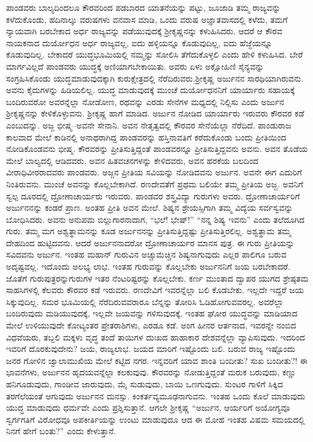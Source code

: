 ಪಾಂಡವರು ಬಾಲ್ಯದಿಂದಲೂ ಕೌರವರಿಂದ ಪಡಬಾರದ ಯಾತನೆಯನ್ನು ಪಟ್ಟು, ಜೂಜಾಡಿ ತಮ್ಮ ರಾಜ್ಯವನ್ನು ಕಳೆದುಕೊಂಡು, ಹದಿನಾಲ್ಕು ವರುಷಗಳು ವನವಾಸ ಮಾಡಿ, ಒಂದು ವರುಷ ಅಜ್ಞಾತವಾಸದಲ್ಲಿ ಕಳೆದು, ತಮಗೆ ನ್ಯಾಯವಾಗಿ ಬರಬೇಕಾದ ಅರ್ಧ ರಾಜ್ಯವನ್ನು ಪಡೆಯುವುದಕ್ಕೆ ಶ‍್ರೀಕೃಷ್ಣನನ್ನು ಕಳುಹಿಸಿದರು. ಆದರೆ ಆ ಕೌರವ ನಾಯಕನಾದ ದುರ್ಯೋಧನ ಅರ್ಧ ರಾಜ್ಯವಲ್ಲ, ಐದು ಹಳ್ಳಿಯನ್ನೂ ಕೊಡುವುದಿಲ್ಲ, ಐದು ಹೆಜ್ಜೆಯನ್ನೂ ಕೊಡುವುದಿಲ್ಲ. ಬೇಕಾದರೆ ಯುದ್ಧಭೂಮಿಯಲ್ಲಿ ನಮ್ಮನ್ನು ಸೋಲಿಸಿ ತೆಗೆದುಕೊಳ್ಳಲಿ ಎಂದು ಹೇಳಿ ಕಳುಹಿಸಿದ. ಬೇರೆ ಮಾರ್ಗವಿಲ್ಲದೆ ಪಾಂಡವರು ಯುದ್ಧಕ್ಕೆ ಅಣಿಯಾಗಬೇಕಾಯಿತು. ಅವರು ಏಳು ಅಕ್ಷೋಹಿಣಿ ಸೈನ್ಯವನ್ನು ಸಂಗ್ರಹಿಸಿಕೊಂಡು ಯುದ್ಧಮಾಡುವುದಕ್ಕಾಗಿ ಕುರುಕ್ಷೇತ್ರದಲ್ಲಿ ನೆರೆದಿರುವರು.\break ಶ‍್ರೀಕೃಷ್ಣ ಅರ್ಜುನನ ಸಾರಥಿಯಾಗಿರುವನು. ಅವನು ಕೈದುಗಳನ್ನು ಹಿಡಿಯಲಿಲ್ಲ. ಯುದ್ಧ ಮಾಡುವುದಕ್ಕೆ ಮುಂಚೆ ದುರ್ಯೋಧನನಿಗೆ ಯಾರ್ಯಾರು ಸಹಾಯಕ್ಕೆ ಬಂದಿರುವರೋ ಅವರ\-ನ್ನೆಲ್ಲಾ ನೋಡೋಣ, ರಥವನ್ನು ಎರಡು ಸೇನೆಗಳ ಮಧ್ಯದಲ್ಲಿ ನಿಲ್ಲಿಸು ಎಂದು ಅರ್ಜುನ ಶ‍್ರೀಕೃಷ್ಣನನ್ನು ಕೇಳಿಕೊಳ್ಳುವನು. ಶ‍್ರೀಕೃಷ್ಣ ಹಾಗೆ ಮಾಡಿದ. ಅರ್ಜುನ ನೋಡಿದ ಯಾರ್ಯಾರು ಇರುವರು ಕೌರವರ ಕಡೆ ಎಂಬುದನ್ನು. ಅಜ್ಜ ಭೀಷ್ಮ–ಅವನೇ ಸೇನಾನಿ. ಅವನ ನೇತೃತ್ವದಲ್ಲಿ ಕೌರವರ ಸೇನೆಯೆಲ್ಲಾ ನೆರೆದಿದೆ. ಪಾಂಡುರಾಜ ಕಾಲವಾದ ಮೇಲೆ ಕಾಡಿನಲ್ಲಿ ಅನಾಥರಾಗಿದ್ದ ಪಾಂಡವರನ್ನು ಹಸ್ತಿನಾವತಿಗೆ ಕರೆದುಕೊಂಡು ಬಂದು ಪ್ರೀತಿಯಿಂದ ನೋಡಿಕೊಂಡವನು ಭೀಷ್ಮ. ಕೌರವರನ್ನು ಪ್ರೀತಿಸುತ್ತಿದ್ದಂತೆ ಪಾಂಡವರನ್ನೂ ಪ್ರೀತಿಸುತ್ತಿದ್ದವನು ಅವನು. ಅವನ ತೊಡೆಯ ಮೇಲೆ ಬಾಲ್ಯದಲ್ಲಿ ಆಡಿದವರು, ಅವನ ಹಿತವಚನಗಳನ್ನು ಕೇಳಿದವರು, ಅವನ ಹರಕೆಯ ಬಲದಿಂದ ವೀರಾಧಿವೀರರಾದವರು ಪಾಂಡವರು. ಅಜ್ಜನ ಪ್ರೀತಿಯ ಸವಿಯನ್ನು ನೋಡಿದವನು ಅರ್ಜುನ. ಅವನೇ ಈಗ ಎದುರಿಗೆ ನಿಂತಿರುವನು. ಮುಂಚೆ ಅವನನ್ನು ಕೊಲ್ಲಬೇಕಾಗಿದೆ. ರಣದೇವತೆಗೆ ಪ್ರಥಮ ಬಲಿಯೇ ತಮ್ಮ ಪ್ರೀತಿಯ ಅಜ್ಜ. ಅವನಿಗೆ ಸ್ವಲ್ಪ ದೂರದಲ್ಲಿ ದ್ರೋಣಾಚಾರ್ಯರು ಇರುವರು. ಪಾಂಡವರ ಶಸ್ತ್ರವಿದ್ಯಾ ಗುರುಗಳು ಅವರು. ದ್ರೋಣಾಚಾರ್ಯರಿಗೆ ಅರ್ಜುನನನ್ನು ಕಂಡರೆ ಪ್ರಾಣ. ಅಂತಹ ಪ್ರೀತಿ ಅವನ ಮೇಲೆ. ಶಿಷ್ಯನ ಶ್ರೇಯಸ್ಸಿಗಾಗಿ ತಮ್ಮ ವಿದ್ಯೆಯ ಸರ್ವಸ್ವವನ್ನು ಬೋಧಿಸಿದರು. ಅವನು ಅನುಪಮ ಬಿಲ್ಲುಗಾರನಾದಾಗ, “ಭಲೆ! ಭೇಷ್​!” “ನನ್ನ ಶಿಷ್ಯ ಇವನು” ಎಂದು ತಲೆದೂಗಿದ ಗುರು. ತಮ್ಮ ಮಗ ಅಶ್ವತ್ಥಾಮನನ್ನು ಕೂಡ ಅರ್ಜುನನನ್ನು ಪ್ರೀತಿಸುತ್ತಿದ್ದಷ್ಟು ಪ್ರೀತಿಸುತ್ತಿರಲಿಲ್ಲ. ಅಶ್ವತ್ಥಾಮ ತಮ್ಮ ದೇಹದಿಂದ ಹುಟ್ಟಿದವನು. ಆದರೆ ಅರ್ಜುನನಾದರೋ ದ್ರೋಣಾಚಾರ್ಯರ ಮಾನಸ ಪುತ್ರ. ಈ ಗುರು ಪ್ರೀತಿಯನ್ನು ಸವಿದವನು ಅರ್ಜುನ. ಇಂತಹ ಮಹಾನ್ ಗುರುವಿನ ಅಚ್ಚುಮೆಚ್ಚಿನ ಶಿಷ್ಯನಾಗುವುದು ಎಲ್ಲರ ಪಾಲಿಗೂ ಬರುವ ಅದೃಷ್ಟವಲ್ಲ. ಇದೊಂದು ಅಲಭ್ಯ ಲಾಭ. ಇಂತಹ ಗುರುವನ್ನು ಕೊಲ್ಲಬೇಕು ಅರ್ಜುನನಿಗೆ ಜಯ ಬರಬೇಕಾದರೆ. ಜೊತೆಗೆ ಗುರುಪುತ್ರರನ್ನು\break ಗುರುಗಳ ಇತರ ನೆಂಟರಿಷ್ಟರನ್ನು ಕೊಲ್ಲಬೇಕು. ಕರ್ಣ ಮುಂತಾದ ದ್ವಾಪರ ಯುಗದ ಶ್ರೇಷ್ಠತಮ ಸಾಹಸಿಗಳಲ್ಲಿ ಕೆಲವರು ಕೌರವರ ಕಡೆ ಇರುವರು. ರಣದೇವಿಗೆ ಇವರನ್ನೆಲ್ಲಾ ಬಲಿ ಕೊಡಬೇಕು. ಇಲ್ಲದೇ ಇದ್ದರೆ ಜಯ ಸಿಕ್ಕುವುದಿಲ್ಲ. ಸಮರ ಭೂಮಿಯಲ್ಲಿ ನೆರೆದಿರುವವರಾರೂ ಬೆನ್ನನ್ನು ತೋರಿಸಿ ಓಡಿಹೋಗುವವರಲ್ಲ. ಅವರೆಲ್ಲಾ ಬಂದಿರುವುದು ಮಡಿಯುವುದಕ್ಕೆ, ಇಲ್ಲವೇ ಜಯವನ್ನು ಗಳಿಸುವುದಕ್ಕೆ. ಇಂತಹ ಘೋರ ಯುದ್ಧವನ್ನು ಮಾಡಿಯಾದ ಮೇಲೆ ಉಳಿಯುವುದೇ ಕೋಟ್ಯಂತರ ಪ್ರೇತರಾಶಿಗಳು, ಎರಡೂ ಕಡೆ. ಅಂಗ ಹೀನರ ಆರ್ತನಾದ, ಇವರನ್ನೇ ನಂಬಿದ ವಿಧವೆಯರು, ತಬ್ಬಲಿ ಮಕ್ಕಳು ವೃದ್ಧ ತಂದೆ ತಾಯಿಗಳ ದುಃಖದ ಹಾಹಾಕಾರ ದೇಶವನ್ನೆಲ್ಲಾ ವ್ಯಾಪಿಸುವುದು. ಇದರಿಂದ ಇವರಿಗೆ ದೊರಕುವುದೇನು? ಜಯ, ರಾಜ್ಯಲಾಭ. ಜಯದ ಮಾರಿಗೆ ಇಷ್ಟೊಂದು ಬಲಿ. ಬರುವ ರಾಜ್ಯ ಇಷ್ಟೊಂದು ಜನರ ಗೋಳಿನ ಜ್ವಾಲಾಮುಖಿಯ ಮೇಲೆ ಕಟ್ಟಿದ ನಗರ. ಇನ್ನವರಿಗೆ ಯಾವ ಶಾಂತಿ ಬಂದೀತು? ಸುಖ ಬಂದೀತು?! ಈ ಭಾವನೆಗಳು, ಅರ್ಜುನನ ಹೃದಯವನ್ನೆಲ್ಲಾ ಕಲಕುವುವು. ಕೌರವರನ್ನು ನೋಡುತ್ತಿದ್ದಂತೆ ಮರುಕ ಬರುವುದು, ಕಣ್ಣು ಹನಿಗೂಡುವುದು, ಗಾಂಡೀವ ಜಾರುವುದು, ಮೈ ಸುಡುವುದು, ಬಾಯಿ ಒಣಗುವುದು. ಸುಂಟರ ಗಾಳಿಗೆ ಸಿಕ್ಕಿದ ತರಗೆಲೆಯಂತೆ ಆಗುವುದು ಅರ್ಜುನನ ಮನಸ್ಸು. ಕಿಂಕರ್ತವ್ಯಮೂಢನಾಗುವನು. ಇಂತಹ ಒಂದು ಕೊಲೆ ಮಾಡುವುದು ಯುದ್ಧ ಮಾಡುವುದು ಧರ್ಮವೇ ಎಂದು ಪ್ರಶ್ನಿಸುತ್ತಾನೆ. ಆಗಲೇ ಶ‍್ರೀಕೃಷ್ಣ “ಅರ್ಜುನ, ಆರ್ಯರಿಗೆ ಅಯೋಗ್ಯವೂ ಸ್ವರ್ಗಗತಿಗೆ ವಿರೋಧವೂ ಅಪಕೀರ್ತಿಯನ್ನು ಉಂಟು ಮಾಡುವುದೂ ಆದ ಈ ಮೋಹ ಇಂತಹ ವಿಷಮ ಸಮಯದಲ್ಲಿ ನಿನಗೆ ಹೇಗೆ ಬಂತು?” ಎಂದು ಕೇಳುತ್ತಾನೆ.

